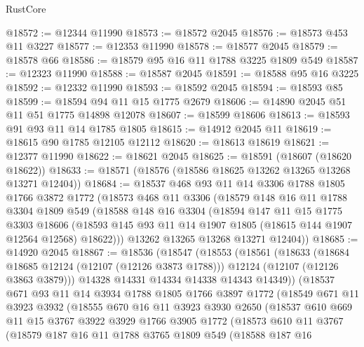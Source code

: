 \begin{lexlean}{RustCore}
\begin{coremodule}
@18572 := @12344 @11990
@18573 := @18572 @2045
@18576 := @18573 @453 @11 @3227
@18577 := @12353 @11990
@18578 := @18577 @2045
@18579 := @18578 @66
@18586 := @18579 @95 @16 @11 @1788 @3225 @1809 @549
@18587 := @12323 @11990
@18588 := @18587 @2045
@18591 := @18588 @95 @16 @3225
@18592 := @12332 @11990
@18593 := @18592 @2045
@18594 := @18593 @85
@18599 := @18594 @94 @11 @15 @1775 @2679
@18606 := @14890 @2045 @51 @11 @51 @1775 @14898 @12078
@18607 := @18599 @18606
@18613 := @18593 @91 @93 @11 @14 @1785 @1805
@18615 := @14912 @2045 @11
@18619 := @18615 @90 @1785 @12105 @12112
@18620 := @18613 @18619
@18621 := @12377 @11990
@18622 := @18621 @2045
@18625 := @18591 (@18607 (@18620 @18622))
@18633 := @18571 (@18576 (@18586 @18625 @13262 @13265 @13268 @13271 @12404))
@18684 := @18537
    @468
    @93
    @11
    @14
    @3306
    @1788
    @1805
    @1766
    @3872
    @1772
    (@18573
      @468
      @11
      @3306
      (@18579
        @148
        @16
        @11
        @1788
        @3304
        @1809
        @549
        (@18588
          @148
          @16
          @3304
          (@18594
            @147
            @11
            @15
            @1775
            @3303
            @18606
            (@18593 @145 @93 @11 @14 @1907 @1805 (@18615 @144 @1907 @12564 @12568) @18622)))
        @13262
        @13265
        @13268
        @13271
        @12404))
@18685 := @14920 @2045
@18867 := @18536
    (@18547
      (@18553
        (@18561
          (@18633
            (@18684 @18685 @12124 (@12107 (@12126 @3873 @1788)))
            @12124
            (@12107 (@12126 @3863 @3879)))
          @14328
          @14331
          @14334
          @14338
          @14343
          @14349))
      (@18537
        @671
        @93
        @11
        @14
        @3934
        @1788
        @1805
        @1766
        @3897
        @1772
        (@18549
          @671
          @11
          @3923
          @3932
          (@18555
            @670
            @16
            @11
            @3923
            @3930
            @2650
            (@18537
              @610
              @669
              @11
              @15
              @3767
              @3922
              @3929
              @1766
              @3905
              @1772
              (@18573
                @610
                @11
                @3767
                (@18579
                  @187
                  @16
                  @11
                  @1788
                  @3765
                  @1809
                  @549
                  (@18588
                    @187
                    @16

\end{coremodule}
\end{lexlean}
